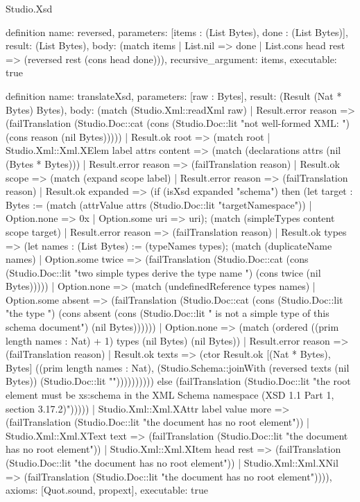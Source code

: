 \begin{lexlean}{Studio.Xsd}
\begin{semanticmodule}
definition{
  name: reversed,
  parameters: [items : (List Bytes), done : (List Bytes)],
  result: (List Bytes),
  body: (match items
    | List.nil => done
    | List.cons head rest => (reversed rest (cons head done))),
  recursive_argument: items,
  executable: true
}

definition{
  name: translateXsd,
  parameters: [raw : Bytes],
  result: (Result (Nat * Bytes) Bytes),
  body: (match (Studio.Xml::readXml raw)
    | Result.error reason => (failTranslation (Studio.Doc::cat (cons (Studio.Doc::lit "not well-formed XML: ") (cons reason (nil Bytes)))))
    | Result.ok root => (match root
      | Studio.Xml::Xml.XElem label attrs content => (match (declarations attrs (nil (Bytes * Bytes)))
        | Result.error reason => (failTranslation reason)
        | Result.ok scope => (match (expand scope label)
          | Result.error reason => (failTranslation reason)
          | Result.ok expanded => (if (isXsd expanded "schema") then (let target : Bytes := (match (attrValue attrs (Studio.Doc::lit "targetNamespace"))
            | Option.none => 0x
            | Option.some uri => uri); (match (simpleTypes content scope target)
            | Result.error reason => (failTranslation reason)
            | Result.ok types => (let names : (List Bytes) := (typeNames types); (match (duplicateName names)
              | Option.some twice => (failTranslation (Studio.Doc::cat (cons (Studio.Doc::lit "two simple types derive the type name ") (cons twice (nil Bytes)))))
              | Option.none => (match (undefinedReference types names)
                | Option.some absent => (failTranslation (Studio.Doc::cat (cons (Studio.Doc::lit "the type ") (cons absent (cons (Studio.Doc::lit " is not a simple type of this schema document") (nil Bytes))))))
                | Option.none => (match (ordered ((prim length names : Nat) + 1) types (nil Bytes) (nil Bytes))
                  | Result.error reason => (failTranslation reason)
                  | Result.ok texts => (ctor Result.ok [(Nat * Bytes), Bytes] ((prim length names : Nat), (Studio.Schema::joinWith (reversed texts (nil Bytes)) (Studio.Doc::lit "\n")))))))))) else (failTranslation (Studio.Doc::lit "the root element must be xs:schema in the XML Schema namespace (XSD 1.1 Part 1, section 3.17.2)")))))
      | Studio.Xml::Xml.XAttr label value more => (failTranslation (Studio.Doc::lit "the document has no root element"))
      | Studio.Xml::Xml.XText text => (failTranslation (Studio.Doc::lit "the document has no root element"))
      | Studio.Xml::Xml.XItem head rest => (failTranslation (Studio.Doc::lit "the document has no root element"))
      | Studio.Xml::Xml.XNil => (failTranslation (Studio.Doc::lit "the document has no root element")))),
  axioms: [Quot.sound, propext],
  executable: true
}
\end{semanticmodule}
\end{lexlean}

